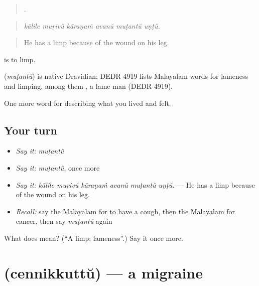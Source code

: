 \begin{quote}
     .
\end{quote}

\begin{quote}
\emph{kālile muṟivŭ kāraṇaṁ avanŭ muṭantŭ uṇṭŭ.}
\end{quote}

\begin{quote}
He has a limp because of the wound on his leg.
\end{quote}

 is to limp.

\begin{cousinweb}
\textbf{} (\emph{muṭantŭ}) is native Dravidian: DEDR 4919 lists Malayalam words for lameness and limping, among them , a lame man (DEDR 4919).
\end{cousinweb}

\begin{grammarlens}[title={What you've built}]
One more word for describing what you lived and felt.
\end{grammarlens}

\subsection*{Your turn}
\begin{itemize}
\raggedright
  \item \emph{Say it:} \emph{muṭantŭ}
  \item \emph{Say it:} \emph{muṭantŭ}, once more
  \item \emph{Say it:} \emph{kālile muṟivŭ kāraṇaṁ avanŭ muṭantŭ uṇṭŭ.} — He has a limp because of the wound on his leg.
  \item \emph{Recall:} say the Malayalam for to have a cough, then the Malayalam for cancer, then say \emph{muṭantŭ} again
\end{itemize}

\begin{tcolorbox}[breakable,colback=teal!4,colframe=teal!35!black,title={Before you move on}]
What does  mean? (\textquotedblleft{}A limp; lameness\textquotedblright{}.) Say it once more.
\end{tcolorbox}
\section[\texorpdfstring{\ml{ചെന്നിക്കുത്ത്} (cennikkuttŭ)}{ചെന്നിക്കുത്ത് (cennikkuttŭ)}]{ (cennikkuttŭ) — a migraine}

